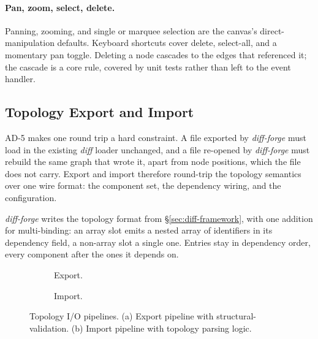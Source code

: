 \paragraph{Pan, zoom, select, delete.}
Panning, zooming, and single or marquee selection are the canvas's direct-manipulation defaults. Keyboard shortcuts cover delete, select-all, and a momentary pan toggle. Deleting a node cascades to the edges that referenced it; the cascade is a core rule, covered by unit tests rather than left to the event handler.

\FloatBarrier

\subsection{Topology Export and Import}
\label{sec:topology-io}
AD-5 makes one round trip a hard constraint. A file exported by \textit{diff-forge} must load in the existing \textit{diff} loader unchanged, and a file re-opened by \textit{diff-forge} must rebuild the same graph that wrote it, apart from node positions, which the file does not carry. Export and import therefore round-trip the topology semantics over one wire format: the component set, the dependency wiring, and the configuration.

\textit{diff-forge} writes the topology format from \S\ref{sec:diff-framework}, with one addition for multi-binding: an array slot emits a nested array of identifiers in its dependency field, a non-array slot a single one. Entries stay in dependency order, every component after the ones it depends on.

\pagebreak

\begin{figure}[H]
    \centering
    \begin{subfigure}[t]{0.48\textwidth}
        \centering
        \resizebox{\textwidth}{!}{}
        \caption{Export.}
        \label{fig:export-pipeline}
    \end{subfigure}
    \hfill
    \begin{subfigure}[t]{0.48\textwidth}
        \centering
        \resizebox{\textwidth}{!}{}
        \caption{Import.}
        \label{fig:import-pipeline}
    \end{subfigure}
    \caption[Topology export and import pipelines.]{Topology I/O pipelines. (a) Export pipeline with structural-validation. (b) Import pipeline with topology parsing logic.}
    \label{fig:topology-io-pipelines}
\end{figure}


